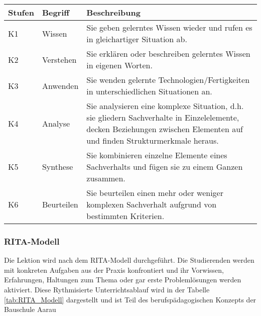 \documentclass[
11pt,
captions=tableheading,
smallheadings,
headsepline,
footsepline, 
captions=tableheading,
parskip=half-,
]{scrartcl}
\begin{document}
\begin{table}[H]
    \centering
    \label{tab:Bloom}
    \caption{Kognitive Taxonomiestufen nach Bloom \cite{bloom1956taxonomy}, adaptiert von \cite{BerufspädagogischesKonzept_BauschuleAarau}.}
    \begin{longtable}{@{}llp{12cm}@{}}
        \toprule
        \textbf{Stufen} & \textbf{Begriff} & \textbf{Beschreibung}                                                                                                                                                    \\
        \midrule
        K1              & Wissen           & Sie geben gelerntes Wissen wieder und rufen es in gleichartiger Situation ab.                                                                                            \\
        K2              & Verstehen        & Sie erklären oder beschreiben gelerntes Wissen in eigenen Worten.                                                                                                        \\
        K3              & Anwenden         & Sie wenden gelernte Technologien/Fertigkeiten in unterschiedlichen Situationen an.                                                                                       \\
        K4              & Analyse          & Sie analysieren eine komplexe Situation, d.h. sie gliedern Sachverhalte in Einzelelemente, decken Beziehungen zwischen Elementen auf und finden Strukturmerkmale heraus. \\
        K5              & Synthese         & Sie kombinieren einzelne Elemente eines Sachverhalts und fügen sie zu einem Ganzen zusammen.                                                                             \\
        K6              & Beurteilen       & Sie beurteilen einen mehr oder weniger komplexen Sachverhalt aufgrund von bestimmten Kriterien.                                                                          \\
        \bottomrule
    \end{longtable}
\end{table}




\subsubsection{RITA-Modell}
Die Lektion wird nach dem RITA-Modell durchgeführt.
Die Studierenden werden mit konkreten Aufgaben aus der Praxis konfrontiert und ihr Vorwissen, Erfahrungen, Haltungen zum Thema oder gar erste Problemlösungen werden aktiviert.
Diese Rythmisierte Unterrichtsablauf wird in der Tabelle \cref{tab:RITA_Modell} dargestellt und ist Teil des berufspädagogischen Konzepts der Bauschule Aarau \cite{BerufspädagogischesKonzept_BauschuleAarau}
\end{document}
